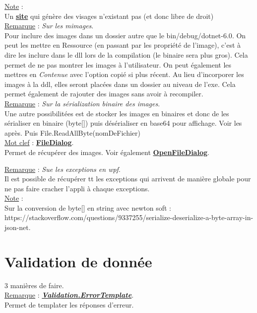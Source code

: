 \documentclass[a4paper,12pt,twoside]{article}
\newcommand{\urlcolor}{magenta}  %
\newcommand{\keycolor}{purple} %
\newcommand{\incode}[1]{{\footnotesize\ttfamily #1}} %
\newcommand{\rem}[2]{\noindent\underline{Remarque} : \textit{#1}.\\ \indent #2}
\newcommand{\note}[1]{\noindent\underline{Note} : \\ \indent #1}
\newcommand{\keyref}[2]{\hypersetup{urlcolor=\keycolor} \href{#1}{\textbf{#2}}\hypersetup{urlcolor=\urlcolor}}
\newcommand{\keyword}[3]{\noindent\underline{Mot clef} : \keyref{#1}{#2}. \\ \indent #3}
\begin{document}
\note{Un \keyref{https://this-person-does-not-exist.com/en}{site} qui génère des visages n'existant pas (et donc libre de droit)}\\

\rem{Sur les mimages}{Pour inclure des images dans un dossier autre que le \incode{bin/debug/dotnet-6.0}. On peut les mettre en Ressource (en passant par les propriété de l'image), c'est à dire les inclure dans le dll lors de la compilation (le binaire sera plus gros). Cela permet de ne pas montrer les images à l'utilisateur. On peut également les mettres en \textit{Contenue} avec l'option copié si plus récent. Au lieu d'incorporer les images à la ddl, elles seront placées dans un dossier au niveau de l'exe. Cela permet également de rajouter des images sans avoir à recompiler.}\\

\rem{Sur la sérialization binaire des images}{Une autre possibilitées est de stocker les images en binaires et donc de les sérialiser en binaire (\incode{byte[]}) puis désérialiser en base64 pour affichage. Voir les après. Puis File.ReadAllByte(nomDeFichier)}\\

\keyword{https://docs.microsoft.com/fr-fr/dotnet/api/system.windows.forms.filedialog?view=windowsdesktop-6.0}{FileDialog}{Permet de récupérer des images. Voir également \keyref{https://docs.microsoft.com/en-us/dotnet/api/system.windows.forms.openfiledialog?view=windowsdesktop-6.0}{OpenFileDialog}.}

\rem{Sue les exceptions en wpf}{Il est possible de récupérer tt les exceptions qui arrivent de manière globale pour ne pas faire cracher l'appli à chaque exceptions.}\\

\note{Sur la conversion de byte[] en string avec newton soft : https://stackoverflow.com/questions/9337255/serialize-deserialize-a-byte-array-in-json-net.}\\

\section{Validation de donnée}

3 manières de faire.\\

\rem{\keyref{https://docs.microsoft.com/fr-fr/dotnet/api/system.windows.controls.validation.errortemplate?view=windowsdesktop-6.0}{Validation.ErrorTemplate}}{Permet de templater les réponses d'erreur.}\\
\end{document}
